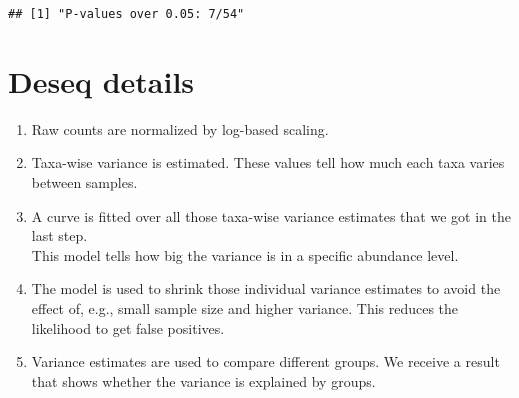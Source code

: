 \documentclass[
  oneside]{book}
\providecommand{\tightlist}{%
  \setlength{\itemsep}{0pt}\setlength{\parskip}{0pt}}
\begin{document}
\begin{verbatim}
## [1] "P-values over 0.05: 7/54"
\end{verbatim}

\hypertarget{deseq-details}{%
\section{Deseq details}\label{deseq-details}}

\begin{enumerate}
\def\labelenumi{\arabic{enumi}.}
\tightlist
\item
  Raw counts are normalized by log-based scaling.\\
\item
  Taxa-wise variance is estimated. These values tell how much each taxa varies between samples.\\
\item
  A curve is fitted over all those taxa-wise variance estimates that we got in the last step.\\
  This model tells how big the variance is in a specific abundance level.
\item
  The model is used to shrink those individual variance estimates to avoid the effect of,
  e.g., small sample size and higher variance. This reduces the likelihood to get
  false positives.\\
\item
  Variance estimates are used to compare different groups. We receive a result that shows whether the variance is explained by groups.
\end{enumerate}

  
\end{document}
